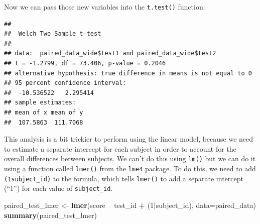 \documentclass[12pt,]{book}
\newenvironment{Shaded}{\begin{snugshade}}{\end{snugshade}}
\newcommand{\DataTypeTok}[1]{\textcolor[rgb]{0.13,0.29,0.53}{#1}}
\newcommand{\DecValTok}[1]{\textcolor[rgb]{0.00,0.00,0.81}{#1}}
\newcommand{\KeywordTok}[1]{\textcolor[rgb]{0.13,0.29,0.53}{\textbf{#1}}}
\newcommand{\NormalTok}[1]{#1}
\newcommand{\OperatorTok}[1]{\textcolor[rgb]{0.81,0.36,0.00}{\textbf{#1}}}
\newcommand{\StringTok}[1]{\textcolor[rgb]{0.31,0.60,0.02}{#1}}
\begin{document}
Now we can pass those new variables into the \texttt{t.test()} function:

\begin{Shaded}
\end{Shaded}

\begin{verbatim}
## 
##  Welch Two Sample t-test
## 
## data:  paired_data_wide$test1 and paired_data_wide$test2
## t = -1.2799, df = 73.406, p-value = 0.2046
## alternative hypothesis: true difference in means is not equal to 0
## 95 percent confidence interval:
##  -10.536522   2.295414
## sample estimates:
## mean of x mean of y 
##  107.5863  111.7068
\end{verbatim}

This analysis is a bit trickier to perform using the linear model, because we need to estimate a separate intercept for each subject in order to account for the overall differences between subjects. We can't do this using \texttt{lm()} but we can do it using a function called \texttt{lmer()} from the \texttt{lme4} package. To do this, we need to add \texttt{(1\textbar{}subject\_id)} to the formula, which tells \texttt{lmer()} to add a separate intercept (``1'') for each value of \texttt{subject\_id}.

\begin{Shaded}
\begin{Highlighting}[]
\NormalTok{paired_test_lmer <-}\StringTok{ }\KeywordTok{lmer}\NormalTok{(score }\OperatorTok{~}\StringTok{ }\NormalTok{test_id }\OperatorTok{+}\StringTok{ }\NormalTok{(}\DecValTok{1}\OperatorTok{|}\NormalTok{subject_id),}
                         \DataTypeTok{data=}\NormalTok{paired_data)}
\KeywordTok{summary}\NormalTok{(paired_test_lmer)}
\end{Highlighting}
\end{Shaded}
\end{document}
